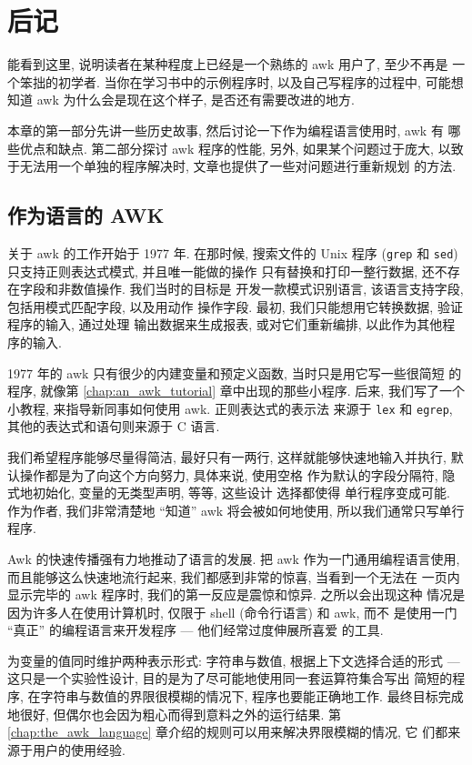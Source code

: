 \chapter{后记}
\label{chap:epilog}

能看到这里, 说明读者在某种程度上已经是一个熟练的 awk 用户了, 至少不再是
一个笨拙的初学者. 当你在学习书中的示例程序时, 以及自己写程序的过程中,
可能想知道 awk 为什么会是现在这个样子, 是否还有需要改进的地方.

本章的第一部分先讲一些历史故事, 然后讨论一下作为编程语言使用时, awk 有
哪些优点和缺点. 第二部分探讨 awk 程序的性能, 另外, 如果某个问题过于庞大,
以致于无法用一个单独的程序解决时, 文章也提供了一些对问题进行重新规划
的方法.

\section{作为语言的 AWK}
\label{sec:awk_as_a_language}

关于 awk 的工作开始于 1977 年. 在那时候, 搜索文件的 Unix 程序
(\texttt{grep} 和 \texttt{sed}) 只支持正则表达式模式, 并且唯一能做的操作
只有替换和打印一整行数据, 还不存在字段和非数值操作. 我们当时的目标是
开发一款模式识别语言, 该语言支持字段, 包括用模式匹配字段, 以及用动作
操作字段. 最初, 我们只能想用它转换数据, 验证程序的输入, 通过处理
输出数据来生成报表, 或对它们重新编排, 以此作为其他程序的输入.

1977 年的 awk 只有很少的内建变量和预定义函数, 当时只是用它写一些很简短
的程序, 就像第 \ref{chap:an_awk_tutorial} 章中出现的那些小程序. 后来,
我们写了一个小教程, 来指导新同事如何使用 awk. 正则表达式的表示法
来源于 \texttt{lex} 和 \texttt{egrep}, 其他的表达式和语句则来源于 C
语言.

我们希望程序能够尽量得简洁, 最好只有一两行, 这样就能够快速地输入并执行,
    默认操作都是为了向这个方向努力, 具体来说, 使用空格
作为默认的字段分隔符, 隐式地初始化, 变量的无类型声明, 等等, 这些设计
选择都使得 单行程序变成可能. 作为作者, 我们非常清楚地 ``知道'' awk
将会被如何地使用, 所以我们通常只写单行程序.

Awk 的快速传播强有力地推动了语言的发展. 把 awk 作为一门通用编程语言使用,
而且能够这么快速地流行起来, 我们都感到非常的惊喜, 当看到一个无法在
一页内显示完毕的 awk 程序时, 我们的第一反应是震惊和惊异. 之所以会出现这种
情况是因为许多人在使用计算机时, 仅限于 shell (命令行语言) 和 awk, 而不
是使用一门 ``真正'' 的编程语言来开发程序 --- 他们经常过度伸展所喜爱
的工具.

为变量的值同时维护两种表示形式: 字符串与数值, 根据上下文选择合适的形式
--- 这只是一个实验性设计, 目的是为了尽可能地使用同一套运算符集合写出
简短的程序, 在字符串与数值的界限很模糊的情况下, 程序也要能正确地工作.
最终目标完成地很好, 但偶尔也会因为粗心而得到意料之外的运行结果. 第 
\ref{chap:the_awk_language} 章介绍的规则可以用来解决界限模糊的情况, 它
们都来源于用户的使用经验.

